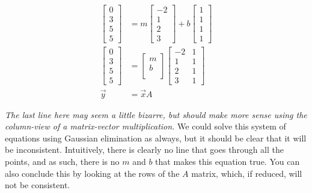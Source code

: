 \documentclass[12pt]{article}
\begin{document}
{\begin{equation}
    \begin{split}
        \begin{bmatrix}
            0\\
            3\\
            5\\
            5
        \end{bmatrix} &= m \begin{bmatrix}
            -2\\
            1\\
            2\\
            3
        \end{bmatrix} + b \begin{bmatrix}
            1\\
            1\\
            1\\
            1
        \end{bmatrix}\\
        \begin{bmatrix}
            0\\
            3\\
            5\\
            5
        \end{bmatrix} &= \begin{bmatrix}
            m\\
            b\\
        \end{bmatrix} \begin{bmatrix}
            -2 & 1\\
            1 & 1\\
            2 & 1\\
            3 & 1
        \end{bmatrix}\\
        \vec{y} &= \vec{x}A
    \end{split}
\end{equation}

\textit{The last line here may seem a little bizarre, but should make more sense using the column-view of a matrix-vector multiplication.} We could solve this system of equations using Gaussian elimination as always, but it should be clear that it will be inconsistent. Intuitively, there is clearly no line that goes through all the points, and as such, there is no $m$ and $b$ that makes this equation true. You can also conclude this by looking at the rows of the $A$ matrix, which, if reduced, will not be consistent.

}
\end{document}
